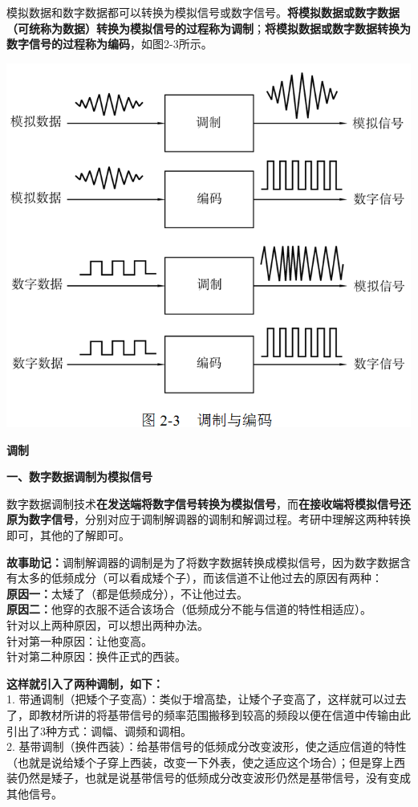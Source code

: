 模拟数据和数字数据都可以转换为模拟信号或数字信号。\textbf{将模拟数据或数字数据（可统称为数据）转换为模拟信号的过程称为调制}；\textbf{将模拟数据或数字数据转换为数字信号的过程称为编码}，如图2-3所示。

\includegraphics[width=6in]{png-jpeg-pics/EB621C2074FA45D90973D4B8CA7D451F.png}

\textbf{{调制}}

\textbf{{一、数字数据调制为模拟信号}}

数字数据调制技术\textbf{在发送端将数字信号转换为模拟信号}，而\textbf{在接收端将模拟信号还原为数字信号}，分别对应于调制解调器的调制和解调过程。考研中理解这两种转换即可，其他的了解即可。

{\textbf{故事助记：}调制解调器的调制是为了将数字数据转换成模拟信号，因为数字数据含有太多的低频成分（可以看成矮个子），而该信道不让他过去的原因有两种：}\\
{\textbf{原因一：}太矮了（都是低频成分），不让他过去。}\\
{\textbf{原因二：}他穿的衣服不适合该场合（低频成分不能与信道的特性相适应）。}\\
{针对以上两种原因，可以想出两种办法。}\\
{针对第一种原因：让他变高。}\\
{针对第二种原因：换件正式的西装。}{}

\textbf{这样就引入了两种调制，如下：}\\
1.
带通调制（把矮个子变高）：类似于增高垫，让矮个子变高了，这样就可以过去了，即教材所讲的将基带信号的频率范围搬移到较高的频段以便在信道中传输由此引出了3种方式：调幅、调频和调相。\\
2.
基带调制（换件西装）：给基带信号的低频成分改变波形，使之适应信道的特性（也就是说给矮个子穿上西装，改变一下外表，使之适应这个场合）；但是穿上西装仍然是矮子，也就是说基带信号的低频成分改变波形仍然是基带信号，没有变成其他信号。

